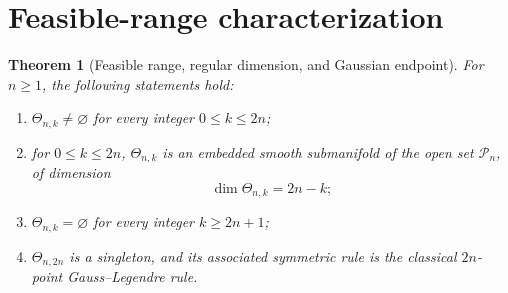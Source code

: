 \documentclass[preprint,12pt]{elsarticle}
\newtheorem{theorem}{Theorem}
\theoremstyle{remark}
\begin{document}
\section{Feasible-range characterization}

\begin{theorem}[Feasible range, regular dimension, and Gaussian endpoint]
For \(n\geq1\), the following statements hold:
\begin{enumerate}[label=(\roman*)]
\item \(\Theta_{n,k}\neq\varnothing\) for every integer
\(0\leq k\leq2n\);
\item for \(0\leq k\leq2n\), \(\Theta_{n,k}\) is an embedded smooth
submanifold of the open set \(\mathcal P_n\), of dimension
\[
\dim\Theta_{n,k}=2n-k;
\]
\item \(\Theta_{n,k}=\varnothing\) for every integer \(k\geq2n+1\);
\item \(\Theta_{n,2n}\) is a singleton, and its associated symmetric
rule is the classical \(2n\)-point Gauss--Legendre rule.
\end{enumerate}
\end{theorem}
\end{document}
